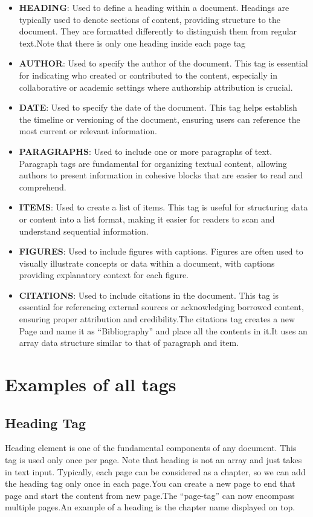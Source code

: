 \documentclass[oneside]{book}
\begin{document}
\begin{itemize}
\item \textbf{HEADING}: Used to define a heading within a document. Headings are typically used to denote sections of content, providing structure to the document.
            They are formatted differently to distinguish them from regular text.Note that there is only one heading inside each page tag
\item \textbf{AUTHOR}: Used to specify the author of the document. This tag is essential for indicating who created or contributed to the content, especially in 
            collaborative or academic settings where authorship attribution is crucial.
\item \textbf{DATE}: Used to specify the date of the document. This tag helps establish the timeline or versioning of the document, ensuring users can reference 
            the most current or relevant information.
\item \textbf{PARAGRAPHS}: Used to include one or more paragraphs of text. Paragraph tags are fundamental for organizing textual content, allowing authors to present
            information in cohesive blocks that are easier to read and comprehend.
\item \textbf{ITEMS}: Used to create a list of items. This tag is useful for structuring data or content into a list format, making it easier for readers to 
            scan and understand sequential information.
\item \textbf{FIGURES}: Used to include figures with captions. Figures are often used to visually illustrate concepts or data within a document,
            with captions providing explanatory context for each figure.
\item \textbf{CITATIONS}: Used to include citations in the document. This tag is essential for referencing external sources or acknowledging borrowed content,
            ensuring proper attribution and credibility.The citations tag creates a new Page and name it as ``Bibliography'' and place all the contents in it.It uses 
            an array data structure similar to that of paragraph and item.
\end{itemize}

\newpage
\chapter{Examples of all tags}
\section{Heading Tag}
Heading element is one of the fundamental components of any document. This tag is used only once per page. Note that heading is not an array and just takes in text input.
        Typically, each page can be considered as a chapter, so we can add the heading tag only once in each page.You can create a new page to end that page and start the 
        content from new page.The ``page-tag'' can now encompass multiple pages.An example of a heading is the chapter name displayed on top.\par
\end{document}
